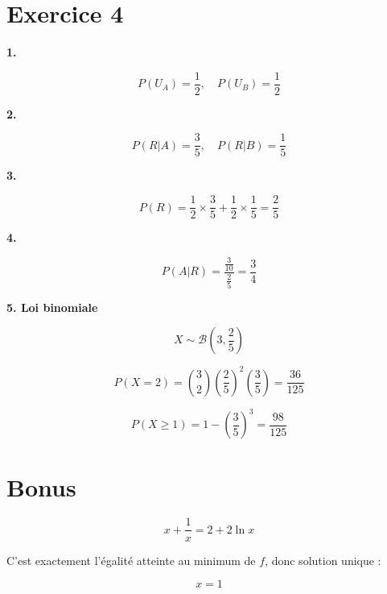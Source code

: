 \documentclass[11pt,a4paper]{article}
\begin{document}
\bigskip

\section*{Exercice 4}

\textbf{1.}

\[
P(U_A)=\frac{1}{2},\quad P(U_B)=\frac{1}{2}
\]

\bigskip

\textbf{2.}

\[
P(R|A)=\frac{3}{5},\quad P(R|B)=\frac{1}{5}
\]

\bigskip

\textbf{3.}

\[
P(R)=\frac{1}{2}\times\frac{3}{5}+\frac{1}{2}\times\frac{1}{5}=\frac{2}{5}
\]

\bigskip

\textbf{4.}

\[
P(A|R)=\frac{\frac{3}{10}}{\frac{2}{5}}=\frac{3}{4}
\]

\bigskip

\textbf{5. Loi binomiale}

\[
X \sim \mathcal{B}(3,\frac{2}{5})
\]

\[
P(X=2)=\binom{3}{2}\left(\frac{2}{5}\right)^2\left(\frac{3}{5}\right)=\frac{36}{125}
\]

\[
P(X\ge1)=1-\left(\frac{3}{5}\right)^3=\frac{98}{125}
\]

\bigskip

\section*{Bonus}

\[
x+\frac{1}{x}=2+2\ln x
\]

C’est exactement l’égalité atteinte au minimum de $f$, donc solution unique :

\[
x=1
\]
\end{document}
